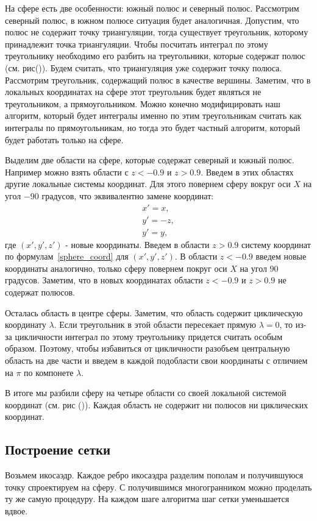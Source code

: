 \documentclass[a4paper,article]{article}
\begin{document}
На сфере есть две особенности: южный полюс и северный
полюс. Рассмотрим северный полюс, в южном полюсе ситуация будет
аналогичная. Допустим, что полюс не содержит точку триангуляции, тогда
существует треугольник, которому принадлежит точка триангуляции. Чтобы
посчитать интеграл по этому треугольнику необходимо его разбить на
треугольники, которые содержат полюс (см. рис()). Будем считать,
что триангуляция уже содержит точку полюса. Рассмотрим треугольник,
содержащий полюс в качестве вершины. Заметим, что в локальных
координатах на сфере этот треугольник будет являться не треугольником,
а прямоугольником. Можно конечно модифицировать наш алгоритм, который
будет интегралы именно по этим треугольникам считать как интегралы по
прямоугольникам, но тогда это будет частный алгоритм, который будет
работать только на сфере. 

Выделим две области на сфере, которые содержат северный и южный
полюс. Например можно взять области с $z<-0.9$ и $z>0.9$. Введем в
этих областях другие локальные системы координат. Для этого повернем сферу
вокруг оси $X$ на угол $-90$ градусов, что эквивалентно замене координат:
\begin{equation*}
\begin{split}
x' = x,\\
y' = -z,\\
y' = y,
\end{split}
\end{equation*}
где $(x',y',z')$ - новые координаты. Введем в области $z>0.9$ систему
координат по формулам~\ref{sphere_coord} для $(x',y',z')$.
В области $z<-0.9$ введем новые координаты аналогично, только сферу
повернем покруг оси $X$ на угол $90$ градусов.
Заметим, что в новых координатах области $z<-0.9$ и $z>0.9$ не
содержат полюсов.

Осталась область в центре сферы. Заметим, что область содержит
циклическую координату $\lambda$. Если треугольник в этой области
пересекает прямую $\lambda=0$, то из-за цикличности интеграл по этому
треугольнику придется считать особым образом. Поэтому, чтобы
избавиться от цикличности разобъем центральную область на две части и
введем в каждой подобласти свои координаты с отличием на $\pi$ по
компонете $\lambda$.

В итоге мы разбили сферу на четыре области со своей локальной системой
координат (см. рис ()). Каждая область не содержит ни полюсов ни
циклических координат. 

\subsection{Построение сетки}
Возьмем икосаэдр. Каждое ребро икосаэдра разделим пополам и
получившуюся точку спроектируем на сферу. С получившимся
многогранником можно проделать ту же самую процедуру. На каждом шаге
алгоритма шаг сетки уменьшается вдвое. 
\end{document}
